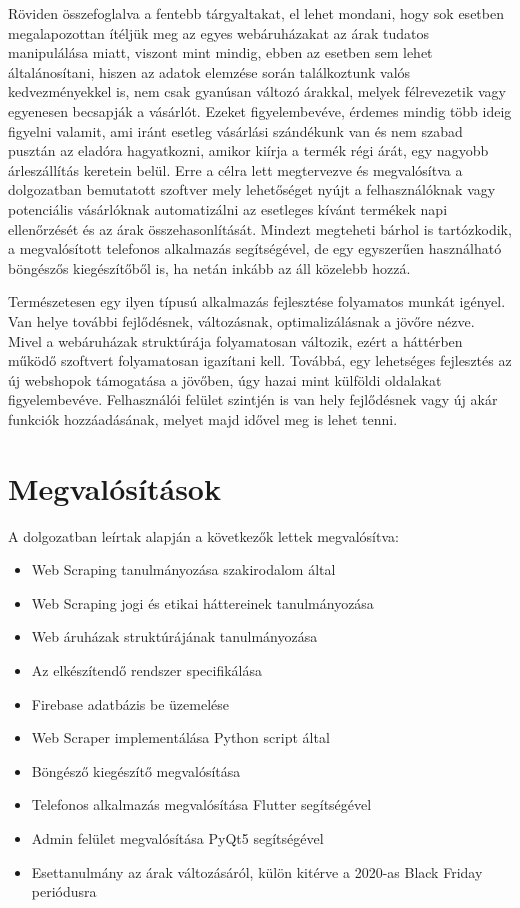 Röviden összefoglalva a fentebb tárgyaltakat, el lehet mondani, hogy sok esetben megalapozottan ítéljük meg az egyes webáruházakat az árak tudatos manipulálása miatt, viszont mint mindig, ebben az esetben sem lehet általánosítani, hiszen az adatok elemzése során találkoztunk valós kedvezményekkel is, nem csak gyanúsan változó árakkal, melyek félrevezetik vagy egyenesen becsapják a vásárlót. Ezeket figyelembevéve, érdemes mindig több ideig figyelni valamit, ami iránt esetleg vásárlási szándékunk van és nem szabad pusztán az eladóra hagyatkozni, amikor kiírja a termék régi árát, egy nagyobb árleszállítás keretein belül. Erre a célra lett megtervezve és megvalósítva a dolgozatban bemutatott szoftver mely lehetőséget nyújt a felhasználóknak vagy potenciális vásárlóknak automatizálni az esetleges kívánt termékek napi ellenőrzését és az árak összehasonlítását. Mindezt megteheti bárhol is tartózkodik, a megvalósított telefonos alkalmazás segítségével, de egy egyszerűen használható böngészős kiegészítőből is, ha netán inkább az áll közelebb hozzá.

Természetesen egy ilyen típusú alkalmazás fejlesztése folyamatos munkát igényel. Van helye további fejlődésnek, változásnak, optimalizálásnak a jövőre nézve. Mivel a webáruházak struktúrája folyamatosan változik, ezért a háttérben működő szoftvert folyamatosan igazítani kell. Továbbá, egy lehetséges fejlesztés az új webshopok támogatása a jövőben, úgy hazai mint külföldi oldalakat figyelembevéve. Felhasználói felület szintjén is van hely fejlődésnek vagy új akár funkciók hozzáadásának, melyet majd idővel meg is lehet tenni.

\section{Megvalósítások}

A dolgozatban leírtak alapján a következők lettek megvalósítva:
\begin{itemize}
    \item Web Scraping tanulmányozása szakirodalom által
    \item Web Scraping jogi és etikai háttereinek tanulmányozása
    \item Web áruházak struktúrájának tanulmányozása
    \item Az elkészítendő rendszer specifikálása
    \item Firebase adatbázis be üzemelése
    \item Web Scraper implementálása Python script által
    \item Böngésző kiegészítő megvalósítása
    \item Telefonos alkalmazás megvalósítása Flutter segítségével
    \item Admin felület megvalósítása PyQt5 segítségével
    \item Esettanulmány az árak változásáról, külön kitérve a 2020-as Black Friday periódusra
\end{itemize}
